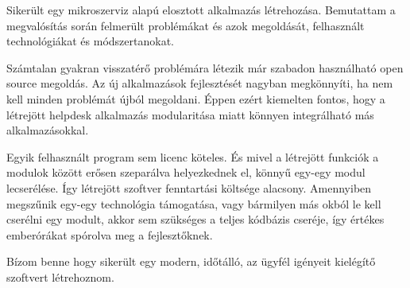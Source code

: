 Sikerült egy mikroszerviz alapú elosztott alkalmazás létrehozása. Bemutattam a megvalósítás során felmerült problémákat és azok megoldását, felhasznált technológiákat és módszertanokat.


Számtalan gyakran visszatérő problémára létezik már szabadon használható open source megoldás. Az új alkalmazások fejlesztését nagyban megkönnyíti, ha nem kell minden problémát újból megoldani. Éppen ezért kiemelten fontos, hogy a létrejött helpdesk alkalmazás modularitása miatt könnyen integrálható más alkalmazásokkal.


Egyik felhasznált program sem licenc köteles. És mivel a létrejött funkciók a modulok között erősen szeparálva helyezkednek el, könnyű egy-egy modul lecserélése. Így  létrejött szoftver fenntartási költsége alacsony. Amennyiben megszűnik egy-egy technológia támogatása, vagy bármilyen más okból le kell cserélni egy modult, akkor sem szükséges a teljes kódbázis cseréje, így értékes emberórákat spórolva meg a fejlesztőknek.

\bigskip
\bigskip

Bízom benne hogy sikerült egy modern, időtálló, az ügyfél igényeit kielégítő szoftvert létrehoznom.